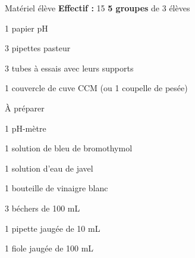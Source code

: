 
\begin{boiteMateriel}{Matériel élève}
  \textbf{Effectif :} 15
  \qq{}\qq{}
  \flecheLongue \textbf{5 groupes} de 3 élèves

  \begin{multicols}{2}
    \begin{protocole}
      \item 1 papier pH
      \item 3 pipettes pasteur
      \item 3 tubes à essais avec leurs supports
      \item 1 couvercle de cuve CCM (ou 1 coupelle de pesée)
    \end{protocole}
  \end{multicols}
\end{boiteMateriel}


\begin{boiteMateriel}{À préparer}
    \begin{protocole}
      \item 1 pH-mètre
      \item 1 solution de bleu de bromothymol
      \item 1 solution d'eau de javel
      \item 1 bouteille de vinaigre blanc
      \item 3 béchers de 100 mL
      \item 1 pipette jaugée de 10 mL
      \item 1 fiole jaugée de 100 mL
    \end{protocole}
\end{boiteMateriel}